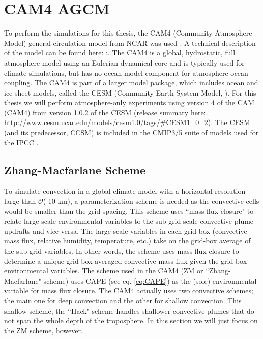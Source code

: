 \documentclass[letterpaper,12pt,titlepage,oneside,final]{book}
\begin{document}
\section{CAM4 AGCM}\label{cam4}
To perform the simulations for this thesis, the CAM4 (Community Atmosphere Model) general circulation model from NCAR was used \citep{neale_mean_2013}. A technical description of the model can be found here: \citep{neale_description_2010}:. The CAM4 is a global, hydrostatic, full atmosphere model using an Eulerian dynamical core and is typically used for climate simulations, but has no ocean model component for atmosphere-ocean coupling. The CAM4 is part of a larger model package, which includes ocean and ice sheet models, called the CESM (Community Earth System Model, \cite{kay_community_2014}). For this thesis we will perform atmosphere-only experiments using version 4 of the CAM (CAM4) from version 1.0.2 of the CESM (release summary here: \url{http://www.cesm.ucar.edu/models/cesm1.0/tags/#CESM1_0_2}). The CESM (and its predecessor, CCSM) is included in the CMIP3/5 suite of models used for the IPCC \citep{taylor_overview_2011}.

\subsection{Zhang-Macfarlane Scheme}\label{ZM}
To simulate convection in a global climate model with a horizontal resolution large than $\mathcal{O}$( 10 km), a parameterization scheme is needed as the convective cells would be smaller than the grid spacing. This scheme uses ``mass flux closure" to relate large scale environmental variables to the sub-grid scale convective plume updrafts and vice-versa. The large scale variables in each grid box (convective mass flux, relative humidity, temperature, etc.) take on the grid-box average of the sub-grid variables. In other words, the scheme uses mass flux closure to determine a unique grid-box averaged convective mass flux given the grid-box environmental variables. The scheme used in the CAM4 (ZM or ``Zhang-Macfarlane" scheme) \citep{zhang_sensitivity_1995} uses CAPE (see eq. \ref{eq:CAPE}) as the (sole) environmental variable for mass flux closure. The CAM4 actually uses two convective schemes; the main one for deep convection and the other for shallow convection. This shallow scheme, the ``Hack" scheme \citep{hack_parameterization_1994} handles shallower convective plumes that do not span the whole depth of the troposphere. In this section we will just focus on the ZM scheme, however.
\end{document}
